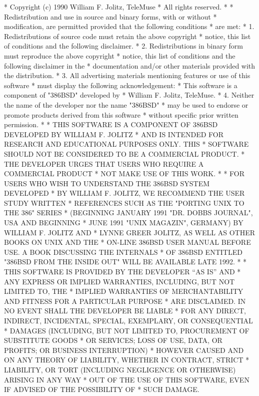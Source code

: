\begin{copyrightEnv}
 * Copyright (c) 1990 William F. Jolitz, TeleMuse
 * All rights reserved.
 *
 * Redistribution and use in source and binary forms, with or without
 * modification, are permitted provided that the following conditions
 * are met:
 * 1. Redistributions of source code must retain the above copyright
 *    notice, this list of conditions and the following disclaimer.
 * 2. Redistributions in binary form must reproduce the above copyright
 *    notice, this list of conditions and the following disclaimer in the
 *    documentation and/or other materials provided with the distribution.
 * 3. All advertising materials mentioning features or use of this software
 *    must display the following acknowledgement:
 *      This software is a component of "386BSD" developed by
 *      William F. Jolitz, TeleMuse.
 * 4. Neither the name of the developer nor the name "386BSD"
 *    may be used to endorse or promote products derived from this software
 *    without specific prior written permission.
 *
 * THIS SOFTWARE IS A COMPONENT OF 386BSD DEVELOPED BY WILLIAM F. JOLITZ
 * AND IS INTENDED FOR RESEARCH AND EDUCATIONAL PURPOSES ONLY. THIS
 * SOFTWARE SHOULD NOT BE CONSIDERED TO BE A COMMERCIAL PRODUCT.
 * THE DEVELOPER URGES THAT USERS WHO REQUIRE A COMMERCIAL PRODUCT
 * NOT MAKE USE OF THIS WORK.
 *
 * FOR USERS WHO WISH TO UNDERSTAND THE 386BSD SYSTEM DEVELOPED
 * BY WILLIAM F. JOLITZ, WE RECOMMEND THE USER STUDY WRITTEN
 * REFERENCES SUCH AS THE  "PORTING UNIX TO THE 386" SERIES
 * (BEGINNING JANUARY 1991 "DR. DOBBS JOURNAL", USA AND BEGINNING
 * JUNE 1991 "UNIX MAGAZIN", GERMANY) BY WILLIAM F. JOLITZ AND
 * LYNNE GREER JOLITZ, AS WELL AS OTHER BOOKS ON UNIX AND THE
 * ON-LINE 386BSD USER MANUAL BEFORE USE. A BOOK DISCUSSING THE INTERNALS
 * OF 386BSD ENTITLED "386BSD FROM THE INSIDE OUT" WILL BE AVAILABLE LATE 1992.
 *
 * THIS SOFTWARE IS PROVIDED BY THE DEVELOPER ``AS IS'' AND
 * ANY EXPRESS OR IMPLIED WARRANTIES, INCLUDING, BUT NOT LIMITED TO, THE
 * IMPLIED WARRANTIES OF MERCHANTABILITY AND FITNESS FOR A PARTICULAR PURPOSE
 * ARE DISCLAIMED.  IN NO EVENT SHALL THE DEVELOPER BE LIABLE
 * FOR ANY DIRECT, INDIRECT, INCIDENTAL, SPECIAL, EXEMPLARY, OR CONSEQUENTIAL
 * DAMAGES (INCLUDING, BUT NOT LIMITED TO, PROCUREMENT OF SUBSTITUTE GOODS
 * OR SERVICES; LOSS OF USE, DATA, OR PROFITS; OR BUSINESS INTERRUPTION)
 * HOWEVER CAUSED AND ON ANY THEORY OF LIABILITY, WHETHER IN CONTRACT, STRICT
 * LIABILITY, OR TORT (INCLUDING NEGLIGENCE OR OTHERWISE) ARISING IN ANY WAY
 * OUT OF THE USE OF THIS SOFTWARE, EVEN IF ADVISED OF THE POSSIBILITY OF
 * SUCH DAMAGE.
\end{copyrightEnv}

